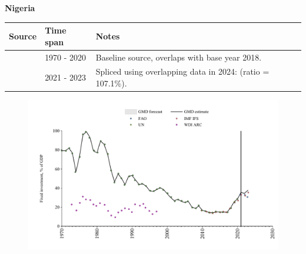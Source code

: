 \documentclass[12pt,a4paper,landscape]{article}
\begin{document}
\begin{adjustbox}{max totalsize={\paperwidth}{\paperheight},center}
\begin{minipage}[t][\textheight][t]{\textwidth}
\vspace*{0.5cm}
{}
\begin{center}
{\Large\bfseries Nigeria}
\end{center}
\vspace{0.5cm}
\begin{table}[H]
\centering
\small
\begin{tabular}{|l|l|l|}
\hline
\textbf{Source} & \textbf{Time span} & \textbf{Notes} \\
\hline
\rowcolor{white}\cite{UN}& 1970 - 2020 &Baseline source, overlaps with base year 2018.\\
\rowcolor{lightgray}\cite{IMF_IFS}& 2021 - 2023 &Spliced using overlapping data in 2024: (ratio = 107.1\%).\\
\hline
\end{tabular}
\end{table}
\begin{figure}[H]
\centering
\includegraphics[width=\textwidth,height=0.6\textheight,keepaspectratio]{graphs/NGA_finv_GDP.pdf}
\end{figure}
\end{minipage}
\end{adjustbox}
\end{document}
